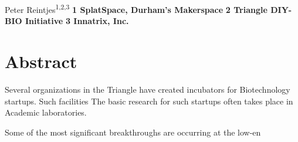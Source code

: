 \documentclass[10pt,letterpaper]{article}
\date{}
\begin{document}
\vspace*{0.2in}
\begin{flushleft}
{\Large
  \textbf{} %
}
\newline
Peter Reintjes\textsuperscript{1,2,3}
\newline
\bigskip
\textbf{1 SplatSpace, Durham's Makerspace}
\newline
\bigskip
\textbf{2 Triangle DIY-BIO Initiative}
\newline
\bigskip
\textbf{3 Innatrix, Inc.}
\bigskip

% 
%






\end{flushleft}
\section*{Abstract}
Several organizations in the Triangle have created incubators for Biotechnology startups.  Such facilities 
The basic research for such startups often takes place in Academic laboratories.

Some of the most significant breakthroughs are occurring at the low-en
\end{document}
